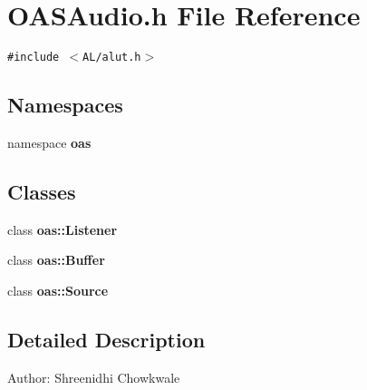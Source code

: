 \section{OASAudio.h File Reference}
\label{OASAudio_8h}
{\tt \#include $<$AL/alut.h$>$}\par
\subsection*{Namespaces}
\begin{CompactItemize}
\item 
namespace \textbf{oas}
\end{CompactItemize}
\subsection*{Classes}
\begin{CompactItemize}
\item 
class \textbf{oas::Listener}
\item 
class \textbf{oas::Buffer}
\item 
class \textbf{oas::Source}
\end{CompactItemize}


\subsection{Detailed Description}
\begin{Desc}
\item[Author:]Shreenidhi Chowkwale \end{Desc}
